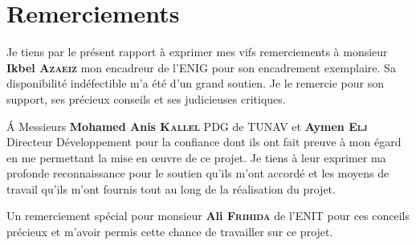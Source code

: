 
\chapter*{Remerciements}

Je tiens par le présent rapport à exprimer mes vifs remerciements à monsieur \textbf{Ikbel \textsc{Azaeiz}} mon encadreur de l'ENIG pour son encadrement exemplaire. Sa disponibilité indéfectible m'a été d'un grand soutien. Je le remercie pour son support, ses précieux conseils et ses judicieuses critiques.

 Á Messieurs \textbf{Mohamed Anis \textsc{Kallel}} PDG de TUNAV et \textbf{Aymen \textsc{Elj}} Directeur Développement pour la confiance dont ils ont fait preuve à mon égard en me permettant la mise en œuvre de ce projet. Je tiens à leur exprimer ma profonde reconnaissance pour le soutien qu'ils m'ont accordé et les moyens de travail qu'ils m'ont fournis tout au long de la réalisation du projet.

Un remerciement spécial pour monsieur \textbf{Ali \textsc{Frihida}} de l'ENIT pour ces conceils précieux et m'avoir permis cette chance de travailler sur ce projet.